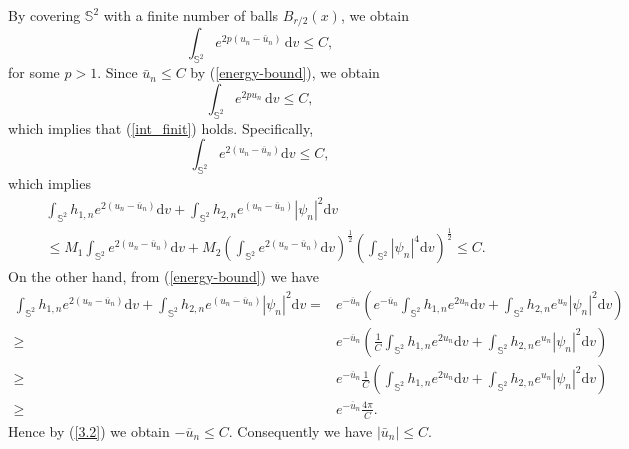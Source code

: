 \documentclass[a4paper, 12pt]{article}
\begin{document}
By covering \( \mathbb{S}^2 \) with a finite number of balls \( B_{r/2}(x) \), we obtain
\begin{equation}\label{3.1}
	\int_{\mathbb{S}^2} e^{2p (u_n - \bar u_n)} \, {\text{d}{v}} \leq C,
\end{equation}
for some \( p > 1 \). Since $\bar {u}_n\leq C$ by (\ref{energy-bound}), we obtain
\begin{equation*}
	\int_{\mathbb{S}^2} e^{2p u_n} \, {\text{d}{v}} \leq C,
\end{equation*} which implies that (\ref{int_finit}) holds. Specifically,  \[
\int_{{{\mathbb{S}^2}}} {{e^{2\left( {{u_n} - {{\overline u }_n}} \right)}}} {\text{d}}v \leq C,
\]
which implies
\begin{equation}\label{3.2}
	\begin{aligned}
		& \int_{{{\mathbb{S}^2}}} {{h_{1,n}}{e^{2\left( {{u_n} - {{\overline u }_n}} \right)}}} {\text{d}}v + \int_{{{\mathbb{S}^2}}} {h_{2,n}}{{e^{\left( {{u_n} - {{\overline u }_n}} \right)}}{{\left| {{\psi _n}} \right|}^2}} {\text{d}}v \\
		& \leq  M_1\int_{{{\mathbb{S}^2}}} {{e^{2\left( {{u_n} - {{\overline u }_n}} \right)}}} {\text{d}}v +M_2 {\left( {\int_{{{\mathbb{S}^2}}} {{e^{2\left( {{u_n} - {{\overline u }_n}} \right)}}{\text{d}}v} } \right)^{\frac{1}{2}}}{\left( {\int_{{{\mathbb{S}^2}}} {{{\left| {{\psi _n}} \right|}^4}} {\text{d}}v} \right)^{\frac{1}{2}}} \leq C.
	\end{aligned}
\end{equation}
On the other hand, from (\ref{energy-bound}) we have
\[
\begin{aligned}
	\int_{{{\mathbb{S}^2}}} {{h_{1,n}}{e^{2\left( {{u_n} - {{\overline u }_n}} \right)}}} {\text{d}}v + \int_{{{\mathbb{S}^2}}} {h_{2,n}}{{e^{\left( {{u_n} - {{\overline u }_n}} \right)}}{{\left| {{\psi _n}} \right|}^2}} {\text{d}}v =& {e^{ - {{\overline u }_n}}}\left( {{e^{ - {{\overline u }_n}}}\int_{{{\mathbb{S}^2}}} {{h_{1,n}}{e^{2{u_n}}}} {\text{d}}v + \int_{{{\mathbb{S}^2}}} {h_{2,n}}{{e^{{u_n}}}{{\left| {{\psi _n}} \right|}^2}} {\text{d}}v} \right)  \\
	\geq& {e^{ - {{\overline u }_n}}}\left( {\frac{1}{C}\int_{{{\mathbb{S}^2}}} {{h_{1,n}}{e^{2{u_n}}}} {\text{d}}v + \int_{{{\mathbb{S}^2}}} {h_{2,n}}{{e^{{u_n}}}{{\left| {{\psi _n}} \right|}^2}} {\text{d}}v} \right)  \\
	\geq& {e^{ - {{\overline u }_n}}}\frac{1}{C}\left( {\int_{{{\mathbb{S}^2}}} {{h_{1,n}}{e^{2{u_n}}}} {\text{d}}v + \int_{{{\mathbb{S}^2}}} {h_{2,n}}{{e^{{u_n}}}{{\left| {{\psi _n}} \right|}^2}} {\text{d}}v} \right)  \\
	\geq& {e^{ - {{\overline u }_n}}}\frac{{4\pi }}{C} .
\end{aligned}
\]
Hence by (\ref{3.2}) we obtain ${{ - {{\overline u }_n}}} \leq C$. Consequently we have $|\bar{u}_n |\leq C.$
\end{document}

